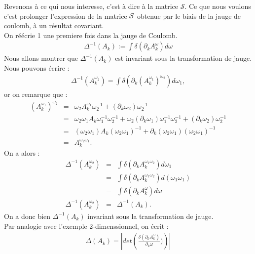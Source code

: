 \documentclass[a4paper,11pt]{article}
\theoremstyle{plain}
\theoremstyle{definition}
\theoremstyle{remark}
\numberwithin{equation}{section}
\numberwithin{equation}{subsection}
\numberwithin{figure}{section}
\begin{document}
\noindent
Revenons à ce qui nous interesse, c'est à dire à la matrice $\mathcal{S}$. Ce que nous voulons c'est prolonger l'expression de la matrice $\cal{S}$ 
obtenue par le biais de la jauge de coulomb, à un résultat covariant.\\
On réécrie 1 une premiere fois dans la jauge de Coulomb.
\begin{eqnarray}
 \Delta^{-1}(A_{k}):= \int \delta \left(\partial_{k}A^{\omega}_{k}\right)d\omega
\end{eqnarray}
Nous allons montrer que $\Delta^{-1}(A_{k})$ est invariant sous la transformation de jauge.\\
Nous pouvons écrire :
\begin{eqnarray}
 \Delta^{-1}(A^{\omega_{2}}_{k})= \int \delta \left(\partial_{k}(A_{k}^{\omega_{1}})^{\omega_{2}}\right)d\omega_{1} ,
\end{eqnarray}
or on remarque que : 
\begin{eqnarray}
 (A_{k}^{\omega_{1}})^{\omega_{2}} &=& \omega_{2}A_{k}^{\omega_{1}}\omega_{2}^{-1} + (\partial_{k}\omega_{2}) \omega_{2}^{-1}\\
                                     &=& \omega_{2}\omega_{1}A_{k}\omega_{1}^{-1}\omega_{2}^{-1} + 
\omega_{2}(\partial_{k}\omega_{1})\omega_{1}^{-1}\omega_{2}^{-1} + (\partial_{k}\omega_{2})\omega_{2}^{-1}\\
                                     &=& (\omega_{2}\omega_{1})A_{k}(\omega_{2}\omega_{1})^{-1} + 
\partial_{k}(\omega_{2}\omega_{1})(\omega_{2}\omega_{1})^{-1} \\
                                    &=& A_{k}^{\omega_{2}\omega_{1}}.
\end{eqnarray}
On a alors : 
\begin{eqnarray}
 \Delta^{-1}(A^{\omega_{2}}_{k})&=& \int \delta \left(\partial_{k}A_{k}^{\omega_{1}\omega_{2}}\right)d\omega_{1}\\
                                  &=& \int \delta \left(\partial_{k}A_{k}^{\omega_{1}\omega_{2}}\right)d(\omega_{1}\omega_{1})\\
                                  &=& \int \delta \left(\partial_{k}A_{k}^{\omega}\right)d\omega\\
 \Delta^{-1}(A^{\omega_{2}}_{k})&=& \Delta^{-1}(A_{k}).
\end{eqnarray}
On a donc bien $\Delta^{-1}(A_{k})$ invariant sous la transformation de jauge. \\
Par analogie avec l'exemple 2-dimenssionnel, on écrit :
\begin{eqnarray}
 \Delta(A_{k}) = \left|det\left(\frac {\delta(\partial_{k}A^{\omega}_{k})}{\partial_{k}\omega})\right)\right|
\end{eqnarray}
\end{document}
